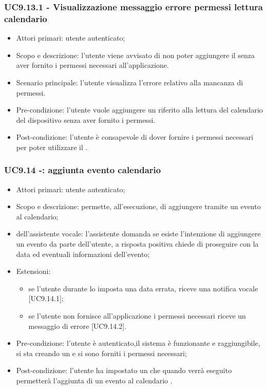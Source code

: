 \subsubsection{UC9.13.1 - Visualizzazione messaggio errore permessi lettura calendario}
\begin{itemize}
	\item  Attori primari: utente autenticato;
	\item  Scopo e descrizione: l'utente viene avvisato di non poter aggiungere il  senza aver fornito i permessi necessari all'applicazione.
	\item  Scenario principale: l'utente visualizza l'errore relativo alla mancanza di permessi.
	\item  Pre-condizione: l'utente vuole aggiungere un  riferito alla lettura del calendario del dispositivo  senza aver fornito i permessi.
	\item  Post-condizione: l'utente è consapevole di dover fornire i permessi necessari per poter utilizzare il .
\end{itemize}
\subsubsection{UC9.14 -: aggiunta evento calendario}
\begin{itemize}
	\item  Attori primari: utente autenticato;
	\item  Scopo e descrizione: permette, all'esecuzione, di aggiungere tramite  un evento al calendario;
	\item  {} dell'assistente vocale: l'assistente domanda se esiste l'intenzione di aggiungere un evento da parte dell'utente, a risposta positiva chiede di proseguire con la data ed eventuali informazioni dell'evento;
	\item  Estensioni: 
		   \begin{itemize}
			    \item se l'utente durante lo  imposta una data errata, riceve una notifica vocale [UC9.14.1];
				\item se l'utente non fornisce all'applicazione i permessi necessari riceve un messaggio di errore [UC9.14.2].
		   \end{itemize}
	\item  Pre-condizione: l'utente è autenticato,il sistema è funzionante e raggiungibile, si sta creando un  e si sono forniti i permessi necessari;
	\item  Post-condizione: l'utente ha impostato un  che quando verrà eseguito permetterà l'aggiunta di un evento al calendario .
\end{itemize}
